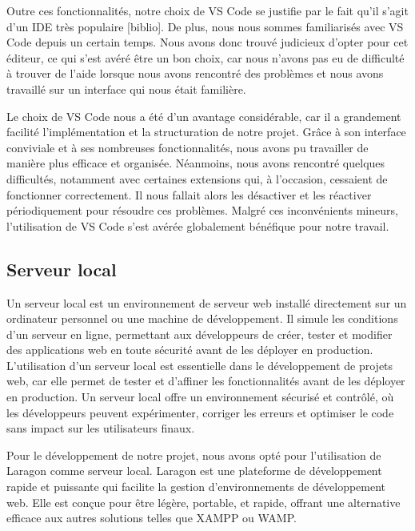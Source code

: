 \par Outre ces fonctionnalités, notre choix de VS Code se justifie par le fait qu'il s'agit d'un IDE très populaire [biblio]. De plus, nous nous sommes familiarisés avec VS Code depuis un certain temps. Nous avons donc trouvé judicieux d’opter pour cet éditeur, ce qui s’est avéré être un bon choix, car nous n’avons pas eu de difficulté à trouver de l’aide lorsque nous avons rencontré des problèmes et nous avons travaillé sur un interface qui nous était familière. 
\par

Le choix de VS Code nous a été d’un avantage considérable, car il a grandement facilité l'implémentation et la structuration de notre projet. Grâce à son interface conviviale et à ses nombreuses fonctionnalités, nous avons pu travailler de manière plus efficace et organisée. Néanmoins, nous avons rencontré quelques difficultés, notamment avec certaines extensions qui, à l'occasion, cessaient de fonctionner correctement. Il nous fallait alors les désactiver et les réactiver périodiquement pour résoudre ces problèmes. Malgré ces inconvénients mineurs, l'utilisation de VS Code s'est avérée globalement bénéfique pour notre travail.
\par 


\subsection{Serveur local}
Un serveur local est un environnement de serveur web installé directement sur un ordinateur personnel ou une machine de développement. Il simule les conditions d'un serveur en ligne, permettant aux développeurs de créer, tester et modifier des applications web en toute sécurité avant de les déployer en production. L'utilisation d'un serveur local est essentielle dans le développement de projets web, car elle permet de tester et d'affiner les fonctionnalités avant de les déployer en production. Un serveur local offre un environnement sécurisé et contrôlé, où les développeurs peuvent expérimenter, corriger les erreurs et optimiser le code sans impact sur les utilisateurs finaux.

Pour le développement de notre projet, nous avons opté pour l'utilisation de Laragon comme serveur local. Laragon est une plateforme de développement rapide et puissante qui facilite la gestion d'environnements de développement web. Elle est conçue pour être légère, portable, et rapide, offrant une alternative efficace aux autres solutions telles que XAMPP ou WAMP.

